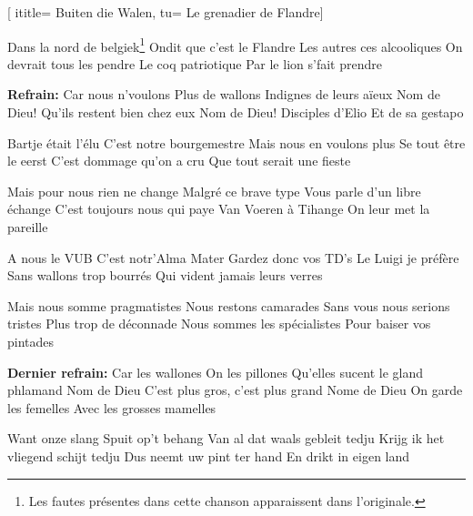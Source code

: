  [
ititle= {Buiten die Walen},
tu= {Le grenadier de Flandre}]


\beginverse
Dans la nord de belgiek\footnote {Les fautes présentes dans cette chanson apparaissent dans l'originale.}
Ondit que c'est le Flandre
Les autres ces alcooliques
On devrait tous les pendre
Le coq patriotique
Par le lion s'fait prendre
\endverse

\beginchorus
\textbf {Refrain:}
Car nous n'voulons
Plus de wallons
Indignes de leurs aïeux
Nom de Dieu!
Qu'ils restent bien chez eux
Nom de Dieu!
Disciples d'Elio
Et de sa gestapo
\endchorus

\beginverse
Bartje était l'élu
C'est notre bourgemestre
Mais nous en voulons plus
Se tout être le eerst
C'est dommage qu'on a cru
Que tout serait une fieste
\endverse

\beginverse
Mais pour nous rien ne change
Malgré ce brave type
Vous parle d'un libre échange
C'est toujours nous qui paye
Van Voeren à Tihange
On leur met la pareille
\endverse

\beginverse
A nous le VUB
C'est notr'Alma Mater
Gardez donc vos TD's
Le Luigi je préfère
Sans wallons trop bourrés
Qui vident jamais leurs verres
\endverse

\beginverse
Mais nous somme pragmatistes
Nous restons camarades
Sans vous nous serions tristes
Plus trop de déconnade
Nous sommes les spécialistes
Pour baiser vos pintades
\endverse

\beginchorus
\textbf {Dernier refrain:}
Car les wallones
On les pillones
Qu'elles sucent le gland phlamand
Nom de Dieu
C'est plus gros, c'est plus grand
Nome de Dieu
On garde les femelles
Avec les grosses mamelles
\endchorus

\beginchorus
Want onze slang
Spuit op't behang
Van al dat waals gebleit tedju
Krijg ik het vliegend schijt tedju
Dus neemt uw pint ter hand
En drikt in eigen land
\endchorus

\endsong